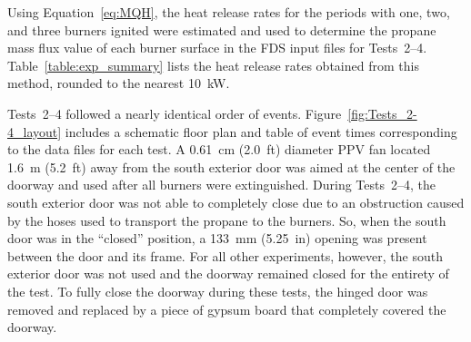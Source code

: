 Using Equation~\ref{eq:MQH}, the heat release rates for the periods with one, two, and three burners ignited were estimated and used to determine the propane mass flux value of each burner surface in the FDS input files for Tests~2--4. Table~\ref{table:exp_summary} lists the heat release rates obtained from this method, rounded to the nearest 10~kW.

Tests~2--4 followed a nearly identical order of events. Figure~\ref{fig:Tests_2-4_layout} includes a schematic floor plan and table of event times corresponding to the data files for each test. A 0.61~cm (2.0~ft) diameter PPV fan located 1.6~m (5.2~ft) away from the south exterior door was aimed at the center of the doorway and used after all burners were extinguished. During Tests~2--4, the south exterior door was not able to completely close due to an obstruction caused by the hoses used to transport the propane to the burners. So, when the south door was in the ``closed'' position, a 133~mm (5.25~in) opening was present between the door and its frame. For all other experiments, however, the south exterior door was not used and the doorway remained closed for the entirety of the test. To fully close the doorway during these tests, the hinged door was removed and replaced by a piece of gypsum board that completely covered the doorway.
\\
